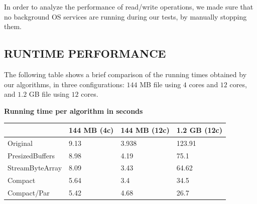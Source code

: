 \documentclass[a4paper,twoside]{article}
\begin{document}
In order to analyze the performance of read/write operations, we made sure that no background OS services are running during our tests, by manually stopping them.




\subsection{\uppercase{Runtime performance}}

The following table shows a brief comparison of the running times obtained by our algorithms, in three configurations: $144$ MB file using $4$ cores and $12$ cores, and $1.2$ GB file using $12$ cores. 

\begin{small}
\par
\begin{center}
\textbf{Running time per algorithm in seconds} \\
\begin{tabular}{|C{2cm}|C{1.2cm}|C{1.2cm}|C{1.2cm}|}
\hline
						& 144 MB (4c)	& 144 MB (12c)		& 1.2 GB (12c)	\\ \hline
Original				& 9.13 			& 3.938 			& 123.91 		\\ \hline
PresizedBuffers			& 8.98 			& 4.19 				& 75.1 			\\ \hline
StreamByteArray			& 8.09 			& 3.43 				& 64.62 		\\ \hline
Compact 				& 5.64 			& 3.4 	 			& 34.5			\\ \hline
Compact/Par 			& 5.42		    & 4.68				& 26.7 			\\ \hline
\end{tabular}
\end{center}
\end{small}
\end{document}
